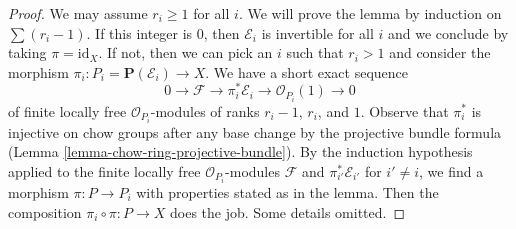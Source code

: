 \documentclass[10pt,a4paper]{amsart}
\theoremstyle{plain}
\theoremstyle{definition}
\theoremstyle{remark}
\numberwithin{equation}{subsection}
\begin{document}
\begin{proof}
We may assume $r_i \geq 1$ for all $i$. We will prove the lemma by induction
on $\sum (r_i - 1)$. If this integer is $0$, then $\mathcal{E}_i$
is invertible for all $i$ and we conclude by taking $\pi = \text{id}_X$.
If not, then we can pick an $i$ such that $r_i > 1$ and consider the
morphism $\pi_i : P_i = \mathbf{P}(\mathcal{E}_i) \to X$.
We have a short exact sequence
$$
0 \to \mathcal{F} \to \pi_i^*\mathcal{E}_i \to \mathcal{O}_{P_i}(1) \to 0
$$
of finite locally free $\mathcal{O}_{P_i}$-modules of ranks $r_i - 1$,
$r_i$, and $1$. Observe that $\pi_i^*$ is injective on chow groups
after any base change by the projective bundle formula
(Lemma \ref{lemma-chow-ring-projective-bundle}).
By the induction hypothesis applied to the finite locally free
$\mathcal{O}_{P_i}$-modules $\mathcal{F}$ and $\pi_{i'}^*\mathcal{E}_{i'}$
for $i' \not = i$, we find a morphism $\pi : P \to P_i$ with
properties stated as in the lemma. Then the composition
$\pi_i \circ \pi : P \to X$ does the job. Some details omitted.
\end{proof}
\end{document}
